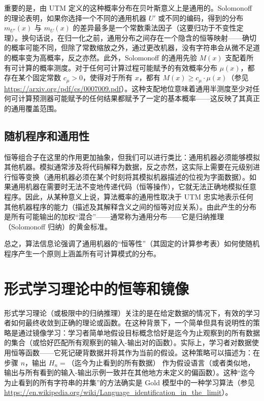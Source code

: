 \documentclass[12pt]{article}
\begin{document}
重要的是，由 UTM 定义的这种概率分布在贝叶斯意义上是通用的。Solomonoff 的理论表明，如果你选择一个不同的通用机器 \( U' \) 或不同的编码，得到的分布 \( m_{U'}(x) \) 与 \( m_U(x) \) 的差异最多是一个常数乘法因子（这要归功于不变性定理）。换句话说，在归一化之前，通用分布之间存在一个隐含的恒等映射——确切的概率可能不同，但除了常数缩放之外，通过更改机器，没有字符串会从微不足道的概率变为高概率，反之亦然。此外，Solomonoff 的通用先验 \( M(x) \) 支配着所有可计算的概率测度。对于任何可计算过程可能赋予的有效概率分布 \( \mu(x) \)，都存在某个固定常数 \( c_{\mu} > 0 \)，使得对于所有 \( x \)，都有 \( M(x) \geq c_{\mu} \cdot \mu(x) \)（参见 \url{https://arxiv.org/pdf/cs/0007009.pdf}）。这种支配地位意味着通用半测度至少对任何可计算预测器可能赋予的任何结果都赋予了一定的基本概率——这反映了其真正的通用覆盖范围。

\subsection{随机程序和通用性}

恒等组合子在这里的作用更加抽象，但我们可以进行类比：通用机器必须能够模拟其他机器。模拟通常涉及将代码解释为数据，反之亦然，这实际上需要在元级别进行恒等变换（通用机器必须在某个时刻将其模拟机器描述的位视为字面数据）。如果通用机器在需要时无法不变地传递代码（恒等操作），它就无法正确地模拟任意程序。因此，从某种意义上说，算法概率的通用性取决于 UTM 忠实地表示任何其他机器程序的能力（描述及其解释含义之间的恒等对应关系）。由此产生的分布是所有可能输出的加权“混合”——通常称为通用分布——它是归纳推理（Solomonoff 归纳）的黄金标准。

总之，算法信息论强调了通用机器的“恒等性”（其固定的计算参考表）如何使随机程序产生一个原则上涵盖所有可计算模式的分布。

\section{形式学习理论中的恒等和镜像}

形式学习理论（或极限中的归纳推理）关注的是在给定数据的情况下，有效的学习者如何最终收敛到正确的理论或函数。在这种背景下，一个简单但具有说明性的策略是通过镜像学习：学习者简单地假设目标概念恰好是迄今为止观察到的所有数据的集合（或恰好匹配所有观察到的输入-输出对的函数）。实际上，学习者对数据使用恒等函数——它死记硬背数据并将其作为当前的假设。这种策略可以描述为：在步骤 \( n \)，输出 \( H_n = \text{（迄今为止看到的所有数据）} \) 作为假设语言（或者类似地，输出与所有看到的输入-输出示例一致并在其他地方未定义的偏函数）。这种“迄今为止看到的所有字符串的并集”的方法确实是 Gold 模型中的一种学习算法（参见 \url{https://en.wikipedia.org/wiki/Language_identification_in_the_limit}）。
\end{document}
